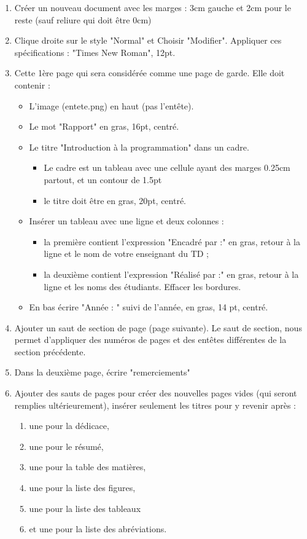 \documentclass[11pt, a4paper]{article}
\begin{document}
\begin{enumerate}
	\item Créer un nouveau document avec les marges : 3cm gauche et 2cm pour le reste (sauf reliure qui doit être 0cm) 
	\item Clique droite sur le style "Normal" et Choisir "Modifier". Appliquer ces spécifications : "Times New Roman", 12pt. 
	\item Cette 1ère page qui sera considérée comme une page de garde.  Elle doit contenir : 
	\begin{multicols}{2}
	\begin{itemize}
		\item L'image (entete.png) en haut (pas l'entête). 
		\item Le mot "Rapport" en gras, 16pt, centré. 
		\item Le titre "Introduction à la programmation" dans un cadre. 
		\begin{itemize}
			\item Le cadre est un tableau avec une cellule ayant des marges 0.25cm partout, et un contour de 1.5pt
			\item le titre doit être en gras, 20pt, centré.
		\end{itemize}
		\item Insérer un tableau avec une ligne et deux colonnes :
		\begin{itemize}
			\item la première  contient l'expression "Encadré par :" en gras, retour à la ligne et le nom de votre enseignant du TD ;
			\item la deuxième contient l'expression "Réalisé par :" en gras, retour à la ligne et les noms des étudiants. Effacer les bordures.
		\end{itemize}
		  
		\item En bas écrire "Année : " suivi de l'année, en gras, 14 pt, centré. 
	\end{itemize}
	\end{multicols}
	\item Ajouter un saut de section de page (page suivante). Le saut de section, nous permet d'appliquer des numéros de pages et des entêtes différentes de la section précédente.
	\item Dans la deuxième page, écrire "remerciements"
	\item Ajouter des sauts de pages pour créer des nouvelles pages vides (qui seront remplies ultérieurement), insérer seulement les titres pour y revenir après :  
	\begin{multicols}{3}
		\begin{enumerate}
			\item une pour la dédicace,
			\item une pour le résumé, 
			\item une pour la table des matières, 
			\item une pour la liste des figures, 
			\item une pour la liste des tableaux 
			\item et une pour la liste des abréviations.
		\end{enumerate}
	\end{multicols}
	

\end{enumerate}
\end{document}
